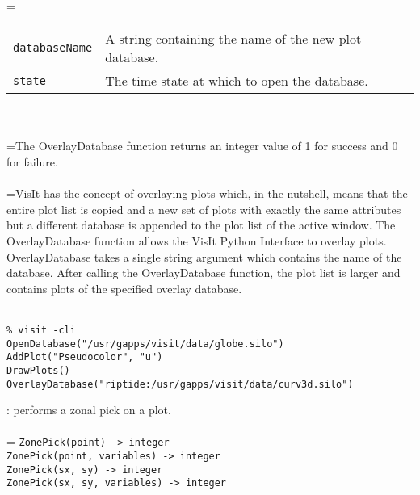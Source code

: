 \documentclass[10pt,a4paper]{report}
\begin{document}
 \\ 
\hangindent=\parindent 
\begin{tabular}{lp{9cm}}
\verb!databaseName! & A string containing the name of the new plot database. \\
\verb!state! & The time state at which to open the database. \\
\end{tabular} \\[-2mm]


 \\ 
\hangindent=\parindent The OverlayDatabase function returns an integer value of 1 for success and 0 for failure. \\[-3mm] 

 \\ 
\hangindent=\parindent VisIt has the concept of overlaying plots which, in the nutshell, means that the entire plot list is copied and a new set of plots with exactly the same attributes but a different database is appended to the plot list of the active window. The OverlayDatabase function allows the VisIt Python Interface to overlay plots. OverlayDatabase takes a single string argument which contains the name of the database. After calling the OverlayDatabase function, the plot list is larger and contains plots of the specified overlay database. \\[-3mm] 

\\[-6mm]
\begin{verbatim}% visit -cli
OpenDatabase("/usr/gapps/visit/data/globe.silo")
AddPlot("Pseudocolor", "u")
DrawPlots()
OverlayDatabase("riptide:/usr/gapps/visit/data/curv3d.silo")
\end{verbatim}
\newpage


{}
: performs a zonal pick on a plot.\\[-3mm]

 \\ 
\hangindent=\parindent 
\verb!ZonePick(point) -> integer!\\ 
\verb!ZonePick(point, variables) -> integer!\\ 
\verb!ZonePick(sx, sy) -> integer!\\ 
\verb!ZonePick(sx, sy, variables) -> integer!\\ [-3mm]
\end{document}
